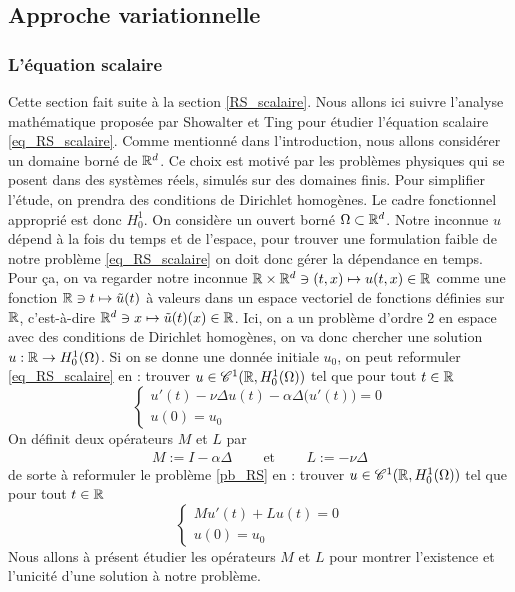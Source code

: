 \subsection{Approche variationnelle}
\subsubsection{L'équation scalaire}
Cette section fait suite à la section \ref{RS_scalaire}. Nous allons ici suivre l'analyse mathématique proposée par Showalter et Ting  \cite{Showalter_Ting} pour étudier l'équation scalaire \eqref{eq_RS_scalaire}. Comme mentionné dans l'introduction, nous allons considérer un domaine borné de $\mathbb{R}^d$. Ce choix est motivé par les problèmes physiques qui se posent dans des systèmes réels, simulés sur des domaines finis. Pour simplifier l'étude, on prendra des conditions de Dirichlet homogènes. 
Le cadre fonctionnel approprié est donc $H^1_0$. 
On considère un ouvert borné $\Omega \subset \mathbb{R}^d$.
Notre inconnue $u$ dépend à la fois du temps et de l'espace, pour trouver une formulation faible de notre 
problème \eqref{eq_RS_scalaire} on doit donc gérer la dépendance en temps. Pour ça, on va \og regarder \fg{}
notre inconnue $\mathbb{R} \times \mathbb{R}^d \ni (t,x) \mapsto u(t,x) \in \mathbb{R}$ comme une fonction 
$\mathbb{R} \ni t \mapsto \tilde{u}(t)$ à valeurs dans un espace vectoriel de fonctions définies sur $\mathbb{R}$, c'est-à-dire 
$\mathbb{R}^d \ni x \mapsto \tilde{u}(t)(x) \in \mathbb{R}$. Ici, on a un problème d'ordre $2$ en espace avec des conditions 
de Dirichlet homogènes, on va donc chercher une solution $u : \mathbb{R} \rightarrow H^1_0(\Omega)$.
Si on se donne une donnée initiale $u_0$, on peut reformuler \eqref{eq_RS_scalaire} en : trouver $u \in \mathscr{C}^1(\mathbb{R}, H^1_0(\Omega))$ tel que pour tout $t \in \mathbb{R}$
\begin{equation}\label{pb_RS}
\begin{cases}
    u'(t) - \nu\Delta u(t) - \alpha\Delta \big(u'(t)\big) = 0  \\
    u(0) = u_0
\end{cases}
\end{equation}
On définit deux opérateurs $M$ et $L$ par
\begin{eqnarray*}
    M := I - \alpha \Delta \ \ \ \ \ &\text{ et }& \ \ \ \ \ L :=-\nu\Delta
\end{eqnarray*}
de sorte à reformuler le problème \eqref{pb_RS} en : trouver $u \in \mathscr{C}^1(\mathbb{R}, H^1_0(\Omega))$ tel que pour tout $t \in \mathbb{R}$
\begin{equation}\label{RS_forme_operateur}
\begin{cases}
    Mu'(t) + Lu(t)=0  \\
    u(0) = u_0
\end{cases}
\end{equation} 
Nous allons à présent étudier les opérateurs $M$ et $L$ pour montrer l'existence et l'unicité d'une solution à notre problème.

